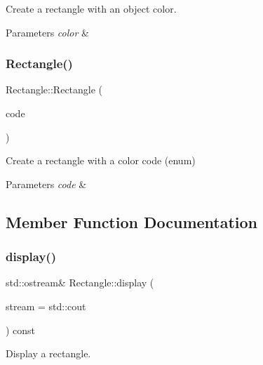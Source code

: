 Create a rectangle with an object color. 


\begin{DoxyParams}{Parameters}
{\em color} & \\
\hline
\end{DoxyParams}
\mbox{\label{classRectangle_ad1af7b79e779d6d8765229f2d41107f6}} 
\subsubsection{\texorpdfstring{Rectangle()}{Rectangle()}\hspace{0.1cm}{\footnotesize\ttfamily [3/3]}}
{\footnotesize\ttfamily Rectangle\+::\+Rectangle (\begin{DoxyParamCaption}\item[{\hyperlink{classColor_a20a7b04657c1d83fae5d54514d3f1622}{Color\+::\+Code}}]{code }\end{DoxyParamCaption})}



Create a rectangle with a color code (enum) 


\begin{DoxyParams}{Parameters}
{\em code} & \\
\hline
\end{DoxyParams}


\subsection{Member Function Documentation}
\mbox{\label{classRectangle_a5b1284a98460b547941ba6ca62ea8ac7}} 
\subsubsection{\texorpdfstring{display()}{display()}}
{\footnotesize\ttfamily std\+::ostream\& Rectangle\+::display (\begin{DoxyParamCaption}\item[{std\+::ostream \&}]{stream = {\ttfamily std\+:\+:cout} }\end{DoxyParamCaption}) const}



Display a rectangle. 


